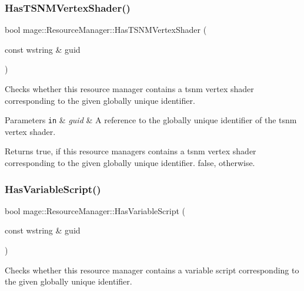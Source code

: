 \subsubsection{\texorpdfstring{Has\+T\+S\+N\+M\+Vertex\+Shader()}{HasTSNMVertexShader()}}
{\footnotesize\ttfamily bool mage\+::\+Resource\+Manager\+::\+Has\+T\+S\+N\+M\+Vertex\+Shader (\begin{DoxyParamCaption}\item[{const wstring \&}]{guid }\end{DoxyParamCaption})\hspace{0.3cm}{\ttfamily [noexcept]}}

Checks whether this resource manager contains a tsnm vertex shader corresponding to the given globally unique identifier.


\begin{DoxyParams}[1]{Parameters}
\mbox{\tt in}  & {\em guid} & A reference to the globally unique identifier of the tsnm vertex shader. \\
\hline
\end{DoxyParams}
\begin{DoxyReturn}{Returns}
{\ttfamily true}, if this resource managers contains a tsnm vertex shader corresponding to the given globally unique identifier. {\ttfamily false}, otherwise. 
\end{DoxyReturn}
\hypertarget{classmage_1_1_resource_manager_a34d72d4729102af23d73438eea629e02}{}\label{classmage_1_1_resource_manager_a34d72d4729102af23d73438eea629e02} 
\subsubsection{\texorpdfstring{Has\+Variable\+Script()}{HasVariableScript()}}
{\footnotesize\ttfamily bool mage\+::\+Resource\+Manager\+::\+Has\+Variable\+Script (\begin{DoxyParamCaption}\item[{const wstring \&}]{guid }\end{DoxyParamCaption})\hspace{0.3cm}{\ttfamily [noexcept]}}

Checks whether this resource manager contains a variable script corresponding to the given globally unique identifier.


